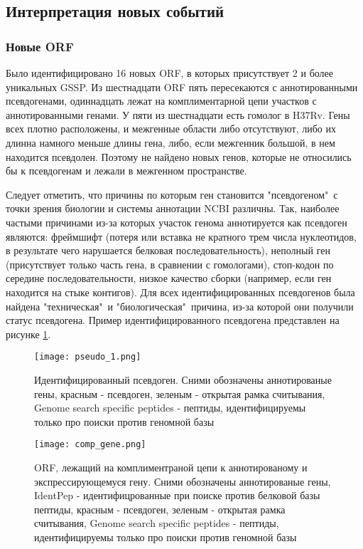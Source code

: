 \subsection{Интерпретация новых событий}
\subsubsection{Новые ORF}
Было идентифицировано 16 новых ORF, в которых присутствует 2 и более уникальных GSSP. Из шестнадцати ORF пять пересекаются с аннотированными псевдогенами, одиннадцать лежат на комплиментарной цепи участков с аннотированными генами. У пяти из шестнадцати есть гомолог в H37Rv. Гены всех  плотно расположены, и межгенные области либо отсутствуют, либо их длинна намного меньше длины гена, либо, если межгенник большой, в нем находится псевдолен. Поэтому не найдено новых генов, которые не относились бы к псевдогенам и лежали в межгенном пространстве.

Следует отметить, что причины по которым ген становится "псевдогеном"\ с точки зрения биологии и системы аннотации NCBI различны. Так, наиболее частыми причинами из-за которых участок генома аннотируется как псевдоген являются: фреймшифт (потеря или вставка не кратного трем числа нуклеотидов, в результате чего нарушается белковая последовательность), неполный ген (присутствует только часть гена, в сравнении с гомологами), стоп-кодон по середине последовательности, низкое качество сборки (например, если ген находится на стыке контигов). Для всех идентифицированных псевдогенов была найдена "техническая"\ и "биологическая"\ причина, из-за которой они получили статус псевдогена. Пример идентифицированного псевдогена представлен на рисунке \ref{pseudo_1}.

\begin{figure}[ph!]
    \begin{center}
        \texttt{[image: pseudo\_1.png]}
    \end{center}
\caption[foo bar]{Идентифицированный псевдоген. Сними обозначены аннотированые гены, красным - псевдоген, зеленым - открытая рамка считывания, Genome search specific peptides - пептиды, идентифицируемы только про поиски против геномной базы}
\label{pseudo_1}
\end{figure}

\begin{figure}[ph!]
    \begin{center}
        \texttt{[image: comp\_gene.png]}
    \end{center}
\caption[foo bar]{ORF, лежащий на комплиментраной цепи к аннотированому и экспрессирующемуся гену. Сними обозначены аннотированые гены, IdentPep - идентифицрованные при поиске против белковой базы пептиды, красным - псевдоген, зеленым - открытая рамка считывания, Genome search specific peptides - пептиды, идентифицируемы только про поиски против геномной базы}
\label{comp_gene}
\end{figure}


